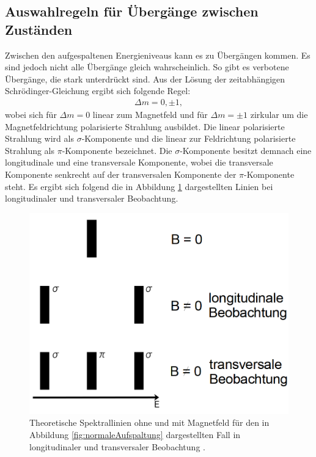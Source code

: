 \subsection{Auswahlregeln für Übergänge zwischen Zuständen}
Zwischen den aufgespaltenen Energieniveaus kann es zu Übergängen kommen. Es sind jedoch nicht alle Übergänge gleich wahrscheinlich. So gibt es verbotene Übergänge, die stark unterdrückt sind. Aus der Lösung der zeitabhängigen Schrödinger-Gleichung ergibt sich folgende Regel: 
\begin{gather}
	\Delta m =0, \pm 1, \label{eq:Auswahlregel}
\end{gather}
wobei sich für $\Delta m=0$ linear zum Magnetfeld und für $\Delta m=\pm 1$ zirkular um die Magnetfeldrichtung polarisierte Strahlung ausbildet. Die linear polarisierte Strahlung wird als $\sigma$-Komponente und die linear zur Feldrichtung polarisierte Strahlung als $\pi$-Komponente bezeichnet. Die $\sigma$-Komponente besitzt demnach eine longitudinale und eine transversale Komponente, wobei die transversale Komponente senkrecht auf der transversalen Komponente der $\pi$-Komponente steht. Es ergibt sich folgend die in Abbildung \ref{fig:linien} dargestellten Linien bei longitudinaler und transversaler Beobachtung.
\begin{figure}
	\centering
	\includegraphics[width=\linewidth-150pt,height=\textheight-150pt,keepaspectratio]{content/Images/linien.png}
    \caption{Theoretische Spektrallinien ohne und mit Magnetfeld für den in Abbildung \ref{fig:normaleAufspaltung} dargestellten Fall in longitudinaler und transversaler Beobachtung \cite{V27}.}
    \label{fig:linien}
\end{figure}


